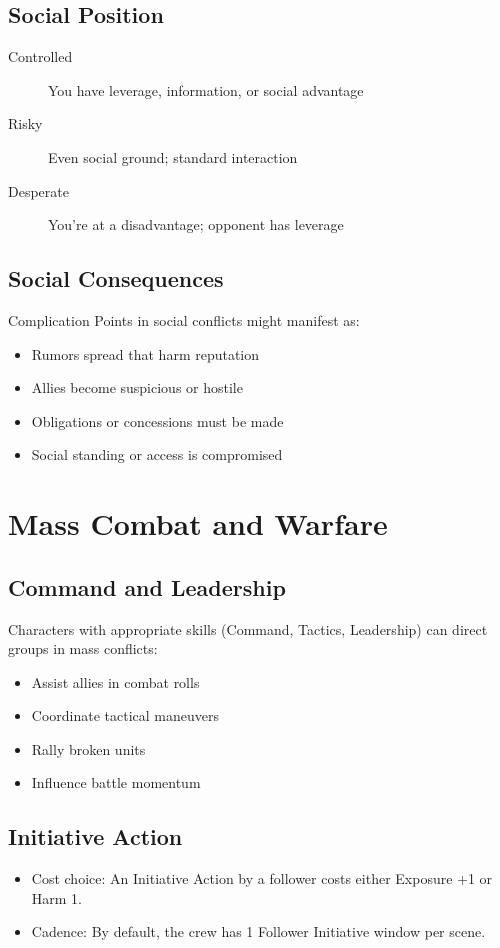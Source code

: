 \subsection{Social Position}

\begin{description}
\item[Controlled] You have leverage, information, or social advantage
\item[Risky] Even social ground; standard interaction
\item[Desperate] You're at a disadvantage; opponent has leverage
\end{description}

\subsection{Social Consequences}

Complication Points in social conflicts might manifest as:
\begin{itemize}
\item Rumors spread that harm reputation
\item Allies become suspicious or hostile
\item Obligations or concessions must be made
\item Social standing or access is compromised
\end{itemize}

\section{Mass Combat and Warfare}

\subsection{Command and Leadership}

Characters with appropriate skills (Command, Tactics, Leadership) can direct groups in mass conflicts:

\begin{itemize}
\item Assist allies in combat rolls
\item Coordinate tactical maneuvers
\item Rally broken units
\item Influence battle momentum
\end{itemize}

\subsection{Initiative Action}
\begin{itemize}
    \item Cost choice: An Initiative Action by a follower costs either Exposure +1 or Harm 1.
    \item Cadence: By default, the crew has 1 Follower Initiative window per scene.
\end{itemize}

